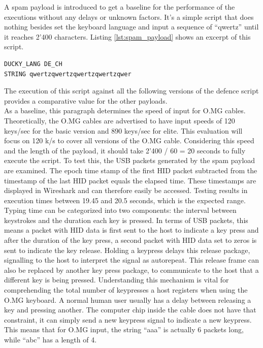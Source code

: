 A spam payload is introduced to get a baseline for the performance of the executions without any delays or unknown factors. It's a simple script that does nothing besides set the keyboard language and input a sequence of ``qwertz'' until it reaches 2’400 characters. Listing \ref{lst:spam_payload} shows an excerpt of this script. 


\begin{lstlisting}[caption={Excerpt: write a string of length 2'400 without delays},label=lst:spam_payload, captionpos=b]
DUCKY_LANG DE_CH
STRING qwertzqwertzqwertzqwertzqwer
\end{lstlisting}

The execution of this script against all the following versions of the defence script provides a comparative value for the other payloads. \\
As a baseline, this paragraph determines the speed of input for O.MG cables. Theoretically, the O.MG cables are advertised to have input speeds of 120 keys/sec for the basic version and 890 keys/sec for elite. This evaluation will focus on 120 k/s to cover all versions of the O.MG cable. Considering this speed and the length of the payload, it should take 2'400 / 60 = 20 seconds to fully execute the script. To test this, the USB packets generated by the spam payload are examined. The epoch time stamp of the first HID packet subtracted from the timestamp of the last HID packet equals the elapsed time. These timestamps are displayed in Wireshark and can therefore easily be accessed. Testing results in execution times between 19.45 and 20.5 seconds, which is the expected range. \\
Typing time can be categorized into two components: the interval between keystrokes and the duration each key is pressed. In terms of USB packets, this means a packet with HID data is first sent to the host to indicate a key press and after the duration of the key press, a second packet with HID data set to zeros is sent to indicate the key release. Holding a keypress delays this release package, signalling to the host to interpret the signal as autorepeat. This release frame can also be replaced by another key press package, to communicate to the host that a different key is being pressed. Understanding this mechanism is vital for comprehending the total number of keypresses a host registers when using the O.MG keyboard. A normal human user usually has a delay between releasing a key and pressing another. The computer chip inside the cable does not have that constraint, it can simply send a new keypress signal to indicate a new keypress. This means that for O.MG input, the string ``aaa'' is actually 6 packets long, while ``abc'' has a length of 4. 


